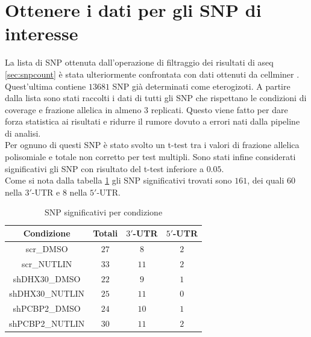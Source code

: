 \section{Ottenere i dati per gli SNP di interesse}
\label{sec:snp_filter}
La lista di SNP ottenuta dall'operazione di filtraggio dei risultati di aseq \ref{sec:snpcount} \`e stata ulteriormente confrontata con dati ottenuti da cellminer \cite{cellminer}.
Quest'ultima contiene $13681$ SNP gi\`a determinati come eterogizoti.
A partire dalla lista sono stati raccolti i dati di tutti gli SNP che rispettano le condizioni di coverage e frazione allelica in almeno $3$ replicati.
Questo viene fatto per dare forza statistica ai risultati e ridurre il rumore dovuto a errori nati dalla pipeline di analisi.\\
Per ognuno di questi SNP \`e stato svolto un t-test tra i valori di frazione allelica polisomiale e totale non corretto per test multipli.
Sono stati infine considerati significativi gli SNP con risultato del t-test inferiore a $0.05$.\\
Come si nota dalla tabella \ref{tab:significativesnp1} gli SNP significativi trovati sono $161$, dei quali $60$ nella $3'$-UTR e $8$ nella $5'$-UTR.
\begin{table}[H]
	\begin{tabular}{|c|c|c|c|}
		\hline
		Condizione & Totali & $3'$-UTR & $5'$-UTR\\
		\hline
		scr\_DMSO & $27$ & $8$ & $2$\\
		\hline
		scr\_NUTLIN & $33$ & $11$ & $2$\\
		\hline
		shDHX30\_DMSO & $22$ & $9$ & $1$\\
		\hline
		shDHX30\_NUTLIN & $25$ & $11$ & $0$\\
		\hline
		shPCBP2\_DMSO & $24$ & $10$ & $1$\\
		\hline
		shPCBP2\_NUTLIN & $30$ & $11$ & $2$\\
		\hline
	\end{tabular}
	\centering
	\label{tab:significativesnp1}
	\caption{SNP significativi per condizione}
\end{table}
